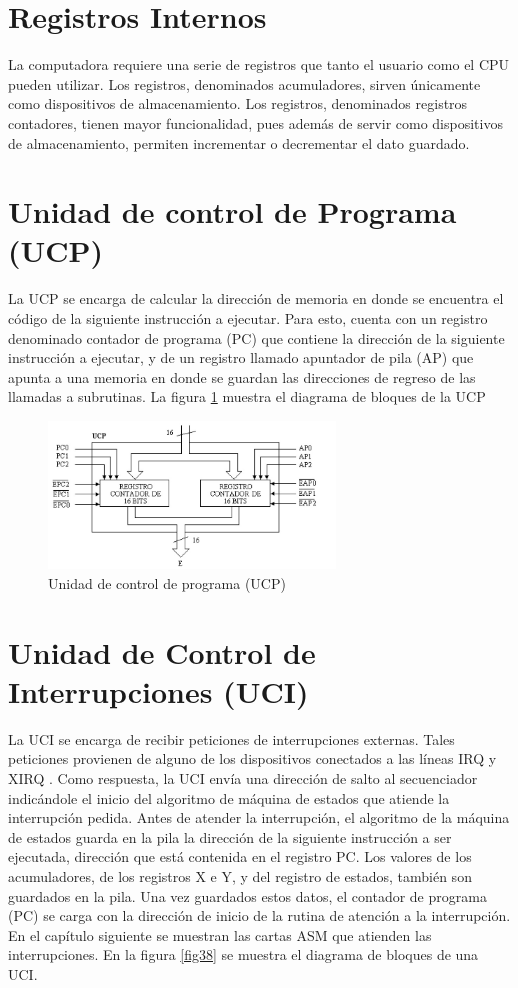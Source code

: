 \documentclass[12pt]{book}
\theoremstyle{definition}
\theoremstyle{remark}
\theoremstyle{plain}
\begin{document}
\section{Registros Internos}

La computadora requiere una serie de registros que tanto el
usuario como el CPU pueden utilizar. Los registros, denominados acumuladores, sirven
únicamente como dispositivos de almacenamiento. Los registros, denominados registros
contadores, tienen mayor funcionalidad, pues además de servir como dispositivos de
almacenamiento, permiten incrementar o decrementar el dato guardado.

\section{Unidad de control de Programa (UCP)}

La UCP se encarga de calcular la dirección de memoria en donde se encuentra el código de la
siguiente instrucción a ejecutar. Para esto, cuenta con un registro denominado contador de programa
(PC) que contiene la dirección de la siguiente instrucción a ejecutar, y de un registro llamado
apuntador de pila (AP) que apunta a una memoria en donde se guardan las direcciones de regreso de
las llamadas a subrutinas. La figura \ref{fig37} muestra el diagrama de bloques de la UCP

\begin{figure}
\centering
\includegraphics[width=3in]{UCP.jpg}
\caption{Unidad de control de programa (UCP)}
\label{fig37}
\end{figure}


\section{Unidad de Control de Interrupciones (UCI)}

La UCI se encarga de recibir peticiones de interrupciones externas. Tales peticiones provienen de
alguno de los dispositivos conectados a las líneas IRQ y XIRQ . Como respuesta, la UCI envía una
dirección de salto al secuenciador indicándole el inicio del algoritmo de máquina de estados que
atiende la interrupción pedida.
Antes de atender la interrupción, el algoritmo de la máquina de estados guarda en la pila la
dirección de la siguiente instrucción a ser ejecutada, dirección que está contenida en el registro PC.
Los valores de los acumuladores, de los registros X e Y, y del registro de estados, también son
guardados en la pila. Una vez guardados estos datos, el contador de programa (PC) se carga con la
dirección de inicio de la rutina de atención a la interrupción. En el capítulo siguiente se muestran las
cartas ASM que atienden las interrupciones. En la figura \ref{fig38} se muestra el diagrama de bloques de una UCI.
\end{document}
